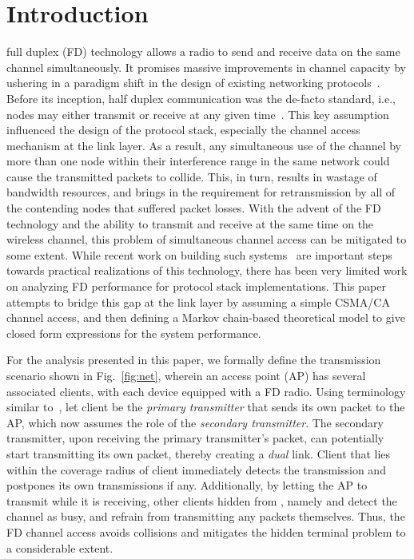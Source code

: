 \documentclass[10pt,journal,cspaper,compsoc]{IEEEtran}
\begin{document}
\maketitle


\IEEEdisplaynotcompsoctitleabstractindextext



\IEEEpeerreviewmaketitle



\section{Introduction}

 full duplex (FD) technology allows a radio to send and receive data on the same channel simultaneously. It promises massive improvements in channel capacity by ushering in a paradigm shift in the design of existing networking protocols~\cite{MSRFDReport09,MSRFDReport27,Choi10,Sahai11,Duarte10,Duarte11,Duarte12}. Before its inception, half duplex communication was the de-facto standard, i.e., nodes may either transmit or receive at any given time~\cite{Goldsmith}. This key assumption influenced the design of the protocol stack, especially the channel access mechanism at the link layer. As a result, any simultaneous use of the channel by more than one node within their interference range in the same network could cause the transmitted packets to collide. This, in turn, results in wastage of bandwidth resources, and brings in the requirement for retransmission by all of the contending nodes that suffered packet losses. With the advent of the FD technology and the ability to 
transmit and receive at the same time on the wireless channel, this problem of simultaneous channel access can be mitigated to some extent. While recent work on building such systems~\cite{Jain11,Bharadia13} are important steps towards practical realizations of this technology, there has been very limited work on analyzing FD performance for protocol stack implementations. This paper attempts to bridge this gap at the link layer by assuming a simple CSMA/CA channel access, and then defining a Markov chain-based theoretical model to give closed form expressions for the system performance. 

For the analysis presented in this paper, we formally define the transmission scenario shown in Fig.~\ref{fig:net}, wherein an access point (AP) has several associated clients, with each device equipped with a FD radio. Using terminology similar to~\cite{MSRFDReport27}, let client  be the \textit{primary transmitter} that sends its own packet to the AP, which now assumes the role of the \textit{secondary transmitter}. The secondary transmitter, upon receiving the primary transmitter's packet, can potentially start transmitting its own packet, thereby creating a \textit{dual} link.
Client  that lies within the coverage radius of client  immediately detects the transmission and postpones its own transmissions if any. Additionally, by letting the AP to transmit while it is receiving, other clients hidden from , namely  and  detect the channel as busy, and refrain from transmitting any packets themselves. Thus, the FD channel access avoids collisions and mitigates the hidden terminal problem to a considerable extent.
\end{document}
